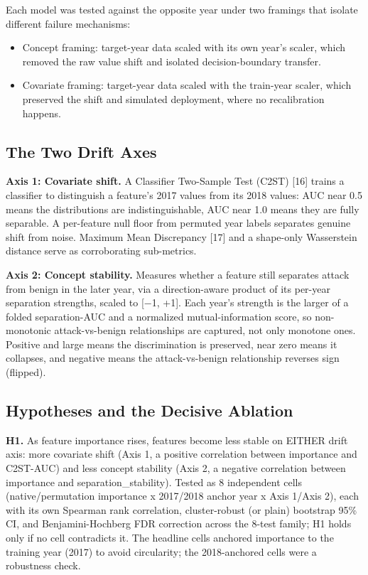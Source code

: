 \documentclass[conference]{IEEEtran}
\begin{document}
Each model was tested against the opposite year under two framings that isolate different failure mechanisms:
\par\medskip

\begin{itemize}[leftmargin=*,itemsep=2pt,topsep=2pt]
  \item Concept framing: target-year data scaled with its own year's scaler, which removed the raw value shift and isolated decision-boundary transfer.
  \item Covariate framing: target-year data scaled with the train-year scaler, which preserved the shift and simulated deployment, where no recalibration happens.
\end{itemize}

\subsection{The Two Drift Axes}

\textbf{Axis 1: Covariate shift.  }A Classifier Two-Sample Test (C2ST) [16] trains a classifier to distinguish a feature's 2017 values from its 2018 values: AUC near 0.5 means the distributions are indistinguishable, AUC near 1.0 means they are fully separable. A per-feature null floor from permuted year labels separates genuine shift from noise. Maximum Mean Discrepancy [17] and a shape-only Wasserstein distance serve as corroborating sub-metrics.\par\medskip

\textbf{Axis 2: Concept stability.  }Measures whether a feature still separates attack from benign in the later year, via a direction-aware product of its per-year separation strengths, scaled to [$-$1, +1]. Each year's strength is the larger of a folded separation-AUC and a normalized mutual-information score, so non-monotonic attack-vs-benign relationships are captured, not only monotone ones. Positive and large means the discrimination is preserved, near zero means it collapses, and negative means the attack-vs-benign relationship reverses sign (flipped).\par\medskip

\subsection{Hypotheses and the Decisive Ablation}

\textbf{H1.  }As feature importance rises, features become less stable on EITHER drift axis: more covariate shift (Axis 1, a positive correlation between importance and C2ST-AUC) and less concept stability (Axis 2, a negative correlation between importance and separation\_\allowbreak{}stability). Tested as 8 independent cells (native/permutation importance x 2017/2018 anchor year x Axis 1/Axis 2), each with its own Spearman rank correlation, cluster-robust (or plain) bootstrap 95\% CI, and Benjamini-Hochberg FDR correction across the 8-test family; H1 holds only if no cell contradicts it. The headline cells anchored importance to the training year (2017) to avoid circularity; the 2018-anchored cells were a robustness check.\par\medskip
\end{document}
